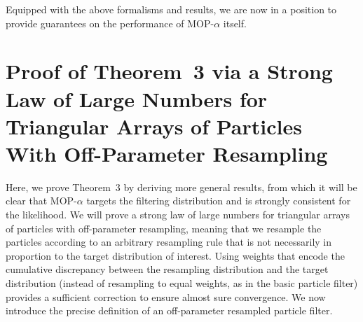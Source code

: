 \documentclass[11pt]{article}
\newcommand\thmMopTargeting{3}
\theoremstyle{thmstylethree}%
\begin{document}
\vspace{3mm}

Equipped with the above formalisms and results, we are now in a position to provide guarantees on the performance of MOP-$\alpha$ itself. 



\section{Proof of Theorem~{\thmMopTargeting} via a Strong Law of Large Numbers for Triangular Arrays of Particles With Off-Parameter Resampling}
\label{appendix:targeting}



Here, we prove Theorem~{\thmMopTargeting} by deriving more general results, from which it will be clear that MOP-$\alpha$ targets the filtering distribution and is strongly consistent for the likelihood.
We will prove a strong law of large numbers for triangular arrays of particles with off-parameter resampling, meaning that we resample the particles according to an arbitrary resampling rule that is not necessarily in proportion to the target distribution of interest. 
Using weights that encode the cumulative discrepancy between the resampling distribution and the target distribution (instead of resampling to equal weights, as in the basic particle filter) provides a sufficient correction to ensure almost sure convergence.
We now introduce the precise definition of an off-parameter resampled particle filter. 
\end{document}

